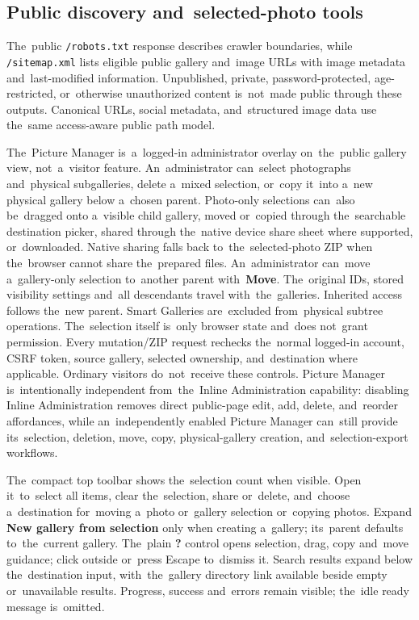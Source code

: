 \documentclass[11pt,a4paper]{article}
\newcommand{\ui}[1]{\textbf{#1}}
\newcommand{\codeword}[1]{\nolinkurl{#1}}
\begin{document}
\subsection{Public discovery and~selected-photo tools}

The~public \codeword{/robots.txt} response describes crawler boundaries, while
\codeword{/sitemap.xml} lists eligible public gallery and~image URLs with image
metadata and~last-modified information. Unpublished, private,
password-protected, age-restricted, or~otherwise unauthorized content
is~not~made public through these outputs. Canonical URLs, social metadata,
and~structured image data use the~same access-aware public path model.

The~Picture Manager is~a~logged-in administrator overlay on~the~public gallery
view, not~a~visitor feature. An~administrator can~select photographs
and~physical subgalleries, delete a~mixed selection, or~copy it~into a~new
physical gallery below a~chosen parent. Photo-only selections can~also
be~dragged onto a~visible child gallery, moved or~copied through the~searchable
destination picker, shared through the~native device share sheet where
supported, or~downloaded. Native sharing falls back to~the~selected-photo ZIP
when the~browser cannot share the~prepared files. An~administrator can~move
a~gallery-only selection to~another parent with~\ui{Move}. The~original IDs,
stored visibility settings and~all descendants travel with~the~galleries.
Inherited access follows the~new parent. Smart Galleries are~excluded
from~physical subtree operations. The~selection itself is~only browser state
and~does not~grant permission. Every mutation/ZIP request rechecks the~normal
logged-in account, CSRF token, source gallery, selected ownership,
and~destination where applicable. Ordinary visitors do~not~receive these
controls. Picture Manager is~intentionally independent from~the~Inline
Administration capability: disabling Inline Administration removes direct
public-page edit, add, delete, and~reorder affordances, while an~independently
enabled Picture Manager can~still provide its~selection, deletion, move, copy,
physical-gallery creation, and~selection-export workflows.

The~compact top toolbar shows the~selection count when visible. Open
it~to~select
all items, clear the~selection, share or~delete, and~choose a~destination
for~moving a~photo or~gallery selection or~copying photos. Expand \ui{New gallery from selection} only
when creating a~gallery; its~parent defaults to~the~current gallery.
The~plain \ui{?} control opens selection, drag, copy and~move guidance;
click outside or~press Escape to~dismiss it. Search results expand below
the~destination input, with~the~gallery directory link available beside
empty or~unavailable results. Progress, success and~errors
remain visible; the~idle ready message is~omitted.
\end{document}
